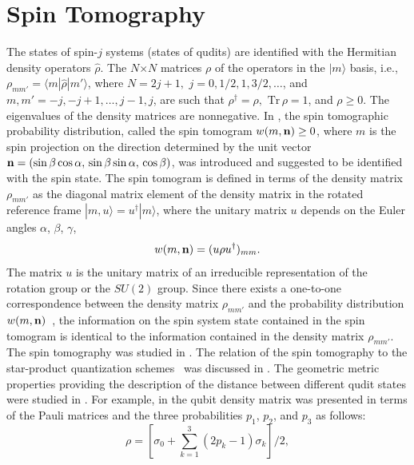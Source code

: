 \documentclass[12pt]{article}
\begin{document}
\section{Spin Tomography}   
The states of spin-$j$ systems (states of qudits) are identified
with the Hermitian density operators $\hat\rho$. The $N$$\times $$N$
matrices $\rho$ of the operators in the $|m\rangle$ basis, i.e.,
$\rho_{m m'}=\langle m|\hat\rho| m'\rangle$, where $N=2j+1,$
$j=0,1/2,1,3/2,\ldots$, and $m, m'=-j,-j+1,\ldots,j-1,j$, are such
that $\rho^\dagger=\rho,$ $\mbox{Tr}\,\rho=1$, and $\rho\geq0$. The
eigenvalues of the density matrices are nonnegative. In
\cite{DodPLA,OlgaJETP}, the spin tomographic probability
distribution,
called the spin tomogram $w(m,{\bf n})\geq 0$, where $m$ is the spin
projection on the direction determined by the unit vector ${\bf
n}=(\sin\beta\cos\alpha,\,\sin\beta\sin\alpha,\,\cos\beta)$, was
introduced and suggested to be identified with the spin state. The
spin tomogram is defined in terms of the density matrix $\rho_{m
m'}$ as the diagonal matrix element of the density matrix in the
rotated reference frame $|m,u\rangle=u^{\dagger}|m\rangle$, where
the unitary matrix $u$ depends on the Euler angles
$\alpha$, $\beta$, $\gamma$,
\begin{equation}\label{eq.1}
w(m,{\bf n})=(u\rho u^{\dagger})_{m m}.
\end{equation}
The matrix $u$ is the unitary matrix of an irreducible
representation of the rotation group or the $SU(2)$ group. Since
there exists a one-to-one correspondence between the density matrix
$\rho_{m m'}$ and the probability distribution $w(m,{\bf
n})$~\cite{OlgaJETP}, the information on the spin system state
contained in the spin tomogram is identical to the information
contained in the density matrix $\rho_{m m'}$. The spin tomography
was studied in
\cite{Weigert1,Wiegert2,Painini,Filipov,CastanosJPA,OlgaMarmoPhysScripta}.
The relation of the spin tomography to the star-product quantization
schemes~\cite{Stratonovich} was discussed in
\cite{OlgaMarmoJPA,OlgaPatrizia,PatriziaLizzi,Ibort,150MarmoPScr}.
The geometric metric properties providing the description of the
distance between different qudit states were studied in
\cite{Patrizia}. For example, in \cite{Patrizia} the qubit density
matrix was presented in terms of the Pauli matrices and the three
probabilities $p_1$, $p_2$, and $p_3$ as follows:
\begin{equation}\label{eq.2}
\rho=\left[\sigma_0+\sum_{k=1}^3\left(2p_k-1\right)\sigma_k\right]/2,
\end{equation}
\end{document}
